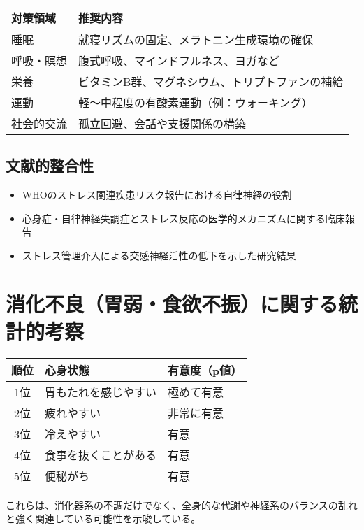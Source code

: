 \documentclass[a4paper,12pt]{article}
\begin{document}
\begin{table}[H]
\centering
\begin{tabular}{|l|p{10cm}|}
\hline
対策領域 & 推奨内容 \\
\hline
睡眠 & 就寝リズムの固定、メラトニン生成環境の確保 \\
呼吸・瞑想 & 腹式呼吸、マインドフルネス、ヨガなど \\
栄養 & ビタミンB群、マグネシウム、トリプトファンの補給 \\
運動 & 軽～中程度の有酸素運動（例：ウォーキング） \\
社会的交流 & 孤立回避、会話や支援関係の構築 \\
\hline
\end{tabular}
\end{table}

\subsection*{文献的整合性}

\begin{itemize}
  \item WHOのストレス関連疾患リスク報告における自律神経の役割
  \item 心身症・自律神経失調症とストレス反応の医学的メカニズムに関する臨床報告
  \item ストレス管理介入による交感神経活性の低下を示した研究結果
\end{itemize}


\section{消化不良（胃弱・食欲不振）に関する統計的考察}
\begin{table}[H]
    \centering
    \begin{tabular}{|c|l|l|}
    \hline
    順位 & 心身状態 & 有意度（p値） \\
    \hline
    1位 & 胃もたれを感じやすい & 極めて有意 \\
    2位 & 疲れやすい & 非常に有意 \\
    3位 & 冷えやすい & 有意 \\
    4位 & 食事を抜くことがある & 有意 \\
    5位 & 便秘がち & 有意 \\
    \hline
\end{tabular}
\end{table}

これらは、消化器系の不調だけでなく、全身的な代謝や神経系のバランスの乱れと強く関連している可能性を示唆している。
\end{document}
